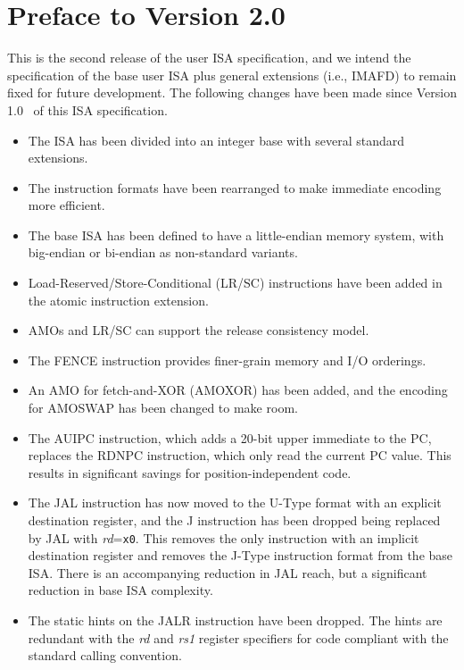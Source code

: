 \section*{Preface to Version 2.0}

This is the second release of the user ISA specification, and we
intend the specification of the base user ISA plus general extensions
(i.e., IMAFD) to remain fixed for future development.  The following
changes have been made since Version 1.0~\cite{riscvtr} of this ISA
specification.

\vspace{-0.1in}
\begin{itemize}
\parskip 0pt
\itemsep 1pt
\item The ISA has been divided into an integer base with several
  standard extensions.
\item The instruction formats have been rearranged to make immediate
  encoding more efficient.
\item The base ISA has been defined to have a little-endian memory system, with
  big-endian or bi-endian as non-standard variants.
\item Load-Reserved/Store-Conditional (LR/SC) instructions have been added in
  the atomic instruction extension.
\item AMOs and LR/SC can support the release consistency model.
\item The FENCE instruction provides finer-grain memory and I/O
  orderings. 
\item An AMO for fetch-and-XOR (AMOXOR) has been added, and the
  encoding for AMOSWAP has been changed to make room.
\item The AUIPC instruction, which adds a 20-bit upper immediate to
  the PC, replaces the RDNPC instruction, which only read the current
  PC value.  This results in significant savings for position-independent
  code.
\item The JAL instruction has now moved to the U-Type format with an
  explicit destination register, and the J instruction has been
  dropped being replaced by JAL with {\em rd}={\tt x0}.  This removes
  the only instruction with an implicit destination register and
  removes the J-Type instruction format from the base ISA.  There is
  an accompanying reduction in JAL reach, but a significant reduction
  in base ISA complexity.
\item The static hints on the JALR instruction have been dropped. The
  hints are redundant with the {\em rd} and {\em rs1} register
  specifiers for code compliant with the standard calling convention.

\end{itemize}
